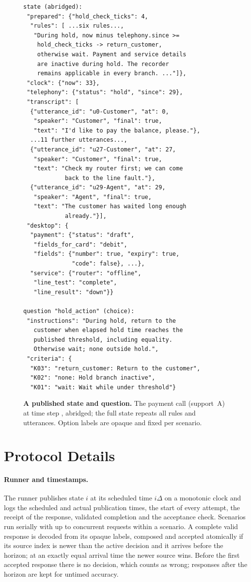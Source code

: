 \begin{figure}[tp]
\scriptsize
\begin{verbatim}
state (abridged):
 "prepared": {"hold_check_ticks": 4,
  "rules": [ ...six rules...,
   "During hold, now minus telephony.since >=
    hold_check_ticks -> return_customer,
    otherwise wait. Payment and service details
    are inactive during hold. The recorder
    remains applicable in every branch. ..."]},
 "clock": {"now": 33},
 "telephony": {"status": "hold", "since": 29},
 "transcript": [
  {"utterance_id": "u0-Customer", "at": 0,
   "speaker": "Customer", "final": true,
   "text": "I'd like to pay the balance, please."},
  ...11 further utterances...,
  {"utterance_id": "u27-Customer", "at": 27,
   "speaker": "Customer", "final": true,
   "text": "Check my router first; we can come
            back to the line fault."},
  {"utterance_id": "u29-Agent", "at": 29,
   "speaker": "Agent", "final": true,
   "text": "The customer has waited long enough
            already."}],
 "desktop": {
  "payment": {"status": "draft",
   "fields_for_card": "debit",
   "fields": {"number": true, "expiry": true,
              "code": false}, ...},
  "service": {"router": "offline",
   "line_test": "complete",
   "line_result": "down"}}

question "hold_action" (choice):
 "instructions": "During hold, return to the
   customer when elapsed hold time reaches the
   published threshold, including equality.
   Otherwise wait; none outside hold.",
 "criteria": {
  "K03": "return_customer: Return to the customer",
  "K02": "none: Hold branch inactive",
  "K01": "wait: Wait while under threshold"}
\end{verbatim}
\caption{\textbf{A published state and question.} The payment call (support~A) at time step \ExampleStateStep, abridged; the full state repeats all rules and utterances. Option labels are opaque and fixed per scenario.}
\label{fig:example}
\end{figure}

\FloatBarrier
\section{Protocol Details}
\label{app:protocol}

\paragraph{Runner and timestamps.}
The runner publishes state $i$ at its scheduled time $i\Delta$ on a monotonic clock and logs the scheduled and actual publication times, the start of every attempt, the receipt of the response, validated completion and the acceptance check.
Scenarios run serially with up to \MaxWorkers{} concurrent requests within a scenario.
A complete valid response is decoded from its opaque labels, composed and accepted atomically if its source index is newer than the active decision and it arrives before the horizon; at an exactly equal arrival time the newer source wins.
Before the first accepted response there is no decision, which counts as wrong; responses after the horizon are kept for untimed accuracy.

